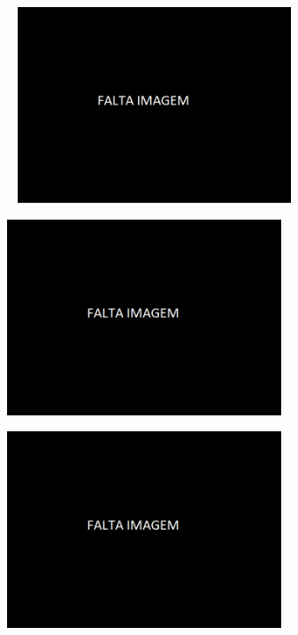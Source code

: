 \begin{figure}[htb]
    \centering
    \begin{subfigure}{.33\textwidth}\
        \centering
        \includegraphics[width = 0.9\textwidth]{Figures/Cap4/Falta_Imagem.png}
        \caption[]%
        {}
        \label{fig:A3_Dent}
    \end{subfigure}%
    \begin{subfigure}{.33\textwidth}
        \centering
        \includegraphics[width = 0.9\textwidth]{Figures/Cap4/Falta_Imagem.png}
        \caption{}
        \label{fig:A1_Dent}
    \end{subfigure}
    \begin{subfigure}{.33\textwidth}
        \centering
        \includegraphics[width = 0.9\textwidth]{Figures/Cap4/Falta_Imagem.png}

\end{subfigure}
\end{figure}
